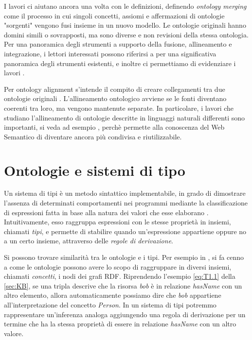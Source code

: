 I lavori \cite{choi2006Mapping, carriero2020OntoReuse} ci aiutano ancora una volta con le definizioni, definendo \textit{ontology merging} come il processo in cui singoli concetti, assiomi e affermazioni di ontologie "sorgenti" vengono fusi insieme in un nuovo modello. Le ontologie originali hanno domini simili o sovrapposti, ma sono diverse e non revisioni della stessa ontologia. Per una panoramica degli strumenti a supporto della fusione, allineamento e integrazione, i lettori interessati possono riferirsi a \cite{choi2006Mapping} per una significativa panoramica degli strumenti esistenti, e inoltre ci permettiamo di evidenziare i lavori \cite{FCA-Merge}. 

Per ontology alignment s'intende il compito di creare collegamenti tra due ontologie originali \cite{choi2006Mapping}. L'allineamento ontologico avviene se le fonti diventano coerenti tra loro, ma vengono mantenute separate. In particolare, i lavori che studiano l'allineamento di ontologie descritte in linguaggi naturali differenti sono importanti, si veda ad esempio \cite{Santos2014StateoftheArtIM}, perchè permette alla conoscenza del Web Semantico di diventare ancora più condivisa e riutilizzabile.

\section{Ontologie e sistemi di tipo}
Un sistema di tipi è un metodo sintattico implementabile, in grado di dimostrare l'assenza di determinati comportamenti nei programmi mediante la classificazione di espressioni fatta in base alla natura dei valori che esse elaborano \cite{pierceTypesBook}. Intuitivamente, esso raggruppa espressioni con le stesse proprietà in insiemi, chiamati \textit{tipi}, e permette di stabilire quando un'espressione appartiene oppure no a un certo insieme, attraverso delle \textsl{regole di derivazione}.

Si possono trovare similarità tra le ontologie e i tipi. Per esempio in \cite{hitzler2021review}, si fa cenno a come le ontologie possono avere lo scopo di raggruppare in diversi insiemi, chiamati \textit{concetti}, i nodi dei grafi RDF. Riprendendo l'esempio \eqref{eq:T1.1} della \autoref{sec:KB}, se una tripla descrive che la risorsa \textsl{bob} è in relazione \textsl{hasName} con un altro elemento, allora automaticamente possiamo dire che \textsl{bob} appartiene all'interpretazione del concetto \textsl{Person}. In un sistema di tipi potremmo rappresentare  un'inferenza analoga aggiungendo una regola di derivazione per un termine che ha la stessa proprietà di essere in relazione \textsl{hasName} con un altro valore.

